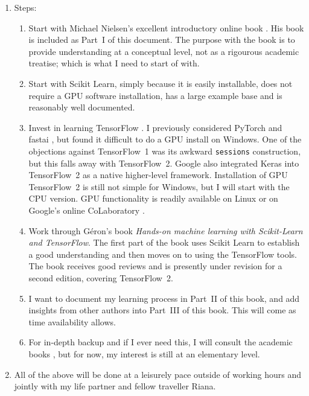 \begin{enumerate}
\item Steps:
\begin{enumerate}
\item Start with Michael Nielsen's excellent introductory online book \cite{Nielsen2015}. His book is included as Part~I of this document.  The purpose with the book is to provide understanding at a conceptual level, not as a rigourous academic treatise; which is what I need to start of with. 
\item Start with Scikit Learn, simply because it is easily installable, does not require a \ac{GPU} software installation, has a large example base and is reasonably well documented.
\item Invest in learning TensorFlow \cite{TensorFlow2Alpha2019}.  I previously considered PyTorch \cite{paszkePyTorch2017,PyTorch2019} and fastai \cite{fastai2019}, but found it difficult to do a GPU install on Windows.  One of the objections against TensorFlow~1 was its awkward \lstinline{sessions}  construction, but this falls away with TensorFlow~2.  Google also integrated Keras \cite{cholletkeras2015,cholletkerasio2015} into TensorFlow~2 as a native higher-level framework.
    Installation of GPU TensorFlow~2 is still not simple for Windows, but I will start with the \ac{CPU} version. GPU functionality is readily available on Linux or on Google's online CoLaboratory \cite{GoogleCoLaboratory2019}.
\item Work through G\'{e}ron's book \cite{geron2017handson} \textit{Hands-on machine learning with Scikit-Learn and TensorFlow}.  The first part of the book uses Scikit Learn to establish a good understanding and then moves on to using the TensorFlow tools.
    The book receives good reviews and is presently under revision for a second edition, covering TensorFlow~2.
\item I want to document my learning process in Part~II of this book, and add insights from other authors into Part~III of this book. This will come as time availability allows.
\item For in-depth backup and if I ever need this, I will consult the academic books \cite{geron2017handson,Webb2002statpatn,Michie94,theodoridis2003,Duda2001,Bishop1995,Bishop2006,Goodfellow2016}, but for now, my interest is still at an elementary level.
\end{enumerate}
\item All of the above will be done at a leisurely pace outside of working hours and jointly with my life partner and fellow traveller Riana.
\end{enumerate}


